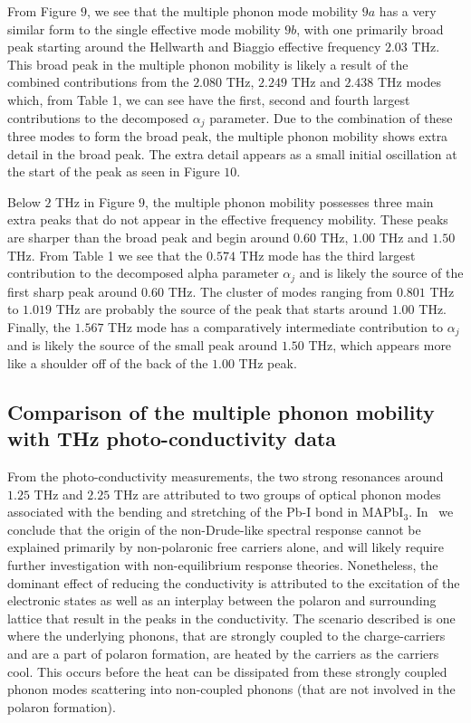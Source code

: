 From Figure $9$, we see that the multiple phonon mode mobility $9a$ has a very similar form to the single effective mode mobility $9b$, with one primarily broad peak starting around the Hellwarth and Biaggio effective frequency $2.03$ THz. This broad peak in the multiple phonon mobility is likely a result of the combined contributions from the $2.080$ THz, $2.249$ THz and $2.438$ THz modes which, from Table 1, we can see have the first, second and fourth largest contributions to the decomposed $\alpha_j$ parameter. Due to the combination of these three modes to form the broad peak, the multiple phonon mobility shows extra detail in the broad peak. The extra detail appears as a small initial oscillation at the start of the peak as seen in Figure $10$. 

Below $2$ THz in Figure $9$, the multiple phonon mobility possesses three main extra peaks that do not appear in the effective frequency mobility. These peaks are sharper than the broad peak and begin around $0.60$ THz, $1.00$ THz and $1.50$ THz. From Table 1 we see that the $0.574$ THz mode has the third largest contribution to the decomposed alpha parameter $\alpha_j$ and is likely the source of the first sharp peak around $0.60$ THz. The cluster of modes ranging from $0.801$ THz to $1.019$ THz are probably the source of the peak that starts around $1.00$ THz. Finally, the $1.567$ THz mode has a comparatively intermediate contribution to $\alpha_j$ and is likely the source of the small peak around $1.50$ THz, which appears more like a shoulder off of the back of the $1.00$ THz peak.

\subsection{Comparison of the multiple phonon mobility with THz photo-conductivity data}

From the photo-conductivity measurements, the two strong resonances around $1.25$ THz and $2.25$ THz are attributed to two groups of optical phonon modes associated with the bending and stretching of the Pb-I bond in MAPbI$_3$. In~\cite{zheng_multipulse_2021} we conclude that the origin of the non-Drude-like spectral response cannot be explained primarily by non-polaronic free carriers alone, and will likely require further investigation with non-equilibrium response theories. Nonetheless, the dominant effect of reducing the conductivity is attributed to the excitation of the electronic states as well as an interplay between the polaron and surrounding lattice that result in the peaks in the conductivity. The scenario described is one where the underlying phonons, that are strongly coupled to the charge-carriers and are a part of polaron formation, are heated by the carriers as the carriers cool. This occurs before the heat can be dissipated from these strongly coupled phonon modes scattering into non-coupled phonons (that are not involved in the polaron formation). 

